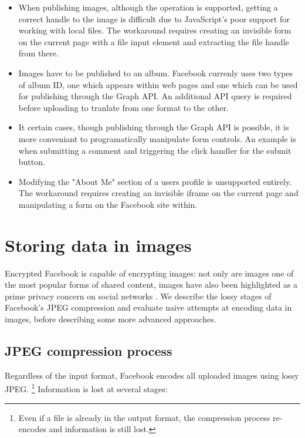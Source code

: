 \begin{itemize}

    \item When publishing images, although the operation is supported, getting a correct handle to the image is difficult due to JavaScript's poor support for working with local files. The workaround requires creating an invisible form on the current page with a file input element and extracting the file handle from there.

    \item Images have to be published to an album. Facebook currenly uses two types of album ID, one which appears within web pages and one which can be used for publishing through the Graph API. An additional API query is required before uploading to tranlate from one format to the other.
    
    \item It certain cases, though publishing through the Graph API is possible, it is more conveniant to programatically manipulate form controls. An example is when submitting a comment and triggering the click handler for the submit button.
    
    \item Modifying the "About Me" section of a users profile is unsupported entirely. The workaround requires creating an invisible iframe on the current page and manipulating a form on the Facebook site within.

\end{itemize}

    
\FloatBarrier
\section{Storing data in images}

Encrypted Facebook is capable of encrypting images: not only are images one of the most popular forms of shared content, images have also been highlighted as a prime privacy concern on social networks \cite{fb-images}. We describe the lossy stages of Facebook's JPEG compression and evaluate naive attempts at encoding data in images, before describing some more advanced approaches.


\FloatBarrier
\subsection{JPEG compression process}

Regardless of the input format, Facebook encodes all uploaded images using lossy JPEG. \footnote{Even if a file is already in the output format, the compression process re-encodes and information is still lost.} Information is lost at several stages:

